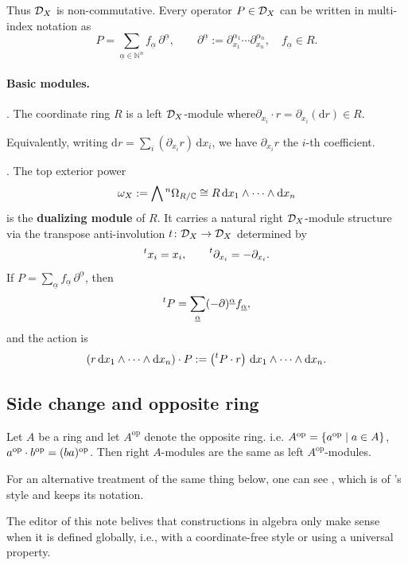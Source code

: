 Thus $\mathcal{D}_X$ is non-commutative. Every operator $P\in\mathcal{D}_X$ can be written in multi-index notation as
\[
    P=\sum_{\underline{\alpha}\in\mathbb N^n} f_{\underline{\alpha}}\,\partial^{\underline{\alpha}},\qquad
    \partial^{\underline{\alpha}}:=\partial_{x_1}^{\alpha_1}\cdots\partial_{x_n}^{\alpha_n},\quad f_{\underline{\alpha}}\in R.
\]

\paragraph{Basic modules.}\mbox{}\par

.  The coordinate ring $R$ is a left $\mathcal{D}_X$-module where$\partial_{x_i}\cdot r = \partial_{x_i}(\mathrm d r)\in R$.

\noindent Equivalently, writing $\mathrm dr=\sum_i (\partial_{x_i}r)\,\mathrm d x_i$, we have $\partial_{x_i}r$ the
$i$-th coefficient.\\

\par{}.  The top exterior power
\[
    \omega_X := \bigwedge{}^{n}\Omega_{R/\mathbb{C}} \cong R\,\mathrm d x_1\wedge\cdots\wedge\mathrm d x_n
\]
is the \textbf{dualizing module} of $R$. It carries a natural right $\mathcal{D}_X$-module structure via the transpose
anti-involution $t\colon \mathcal{D}_X\to\mathcal{D}_X$ determined by
\[
    \prescript{t}{}{x_i}=x_i,\qquad \prescript{t}{}{\partial_{x_i}}=-\partial_{x_i}.
\]
If $P=\sum_{\underline{\alpha}} f_{\underline{\alpha}}\,\partial^{\underline{\alpha}}$, then
\[
    \prescript{t}{}{P}=\sum_{\underline{\alpha}} (-\partial)^{\underline{\alpha}} f_{\underline{\alpha}},
\]
and the action is \cite[Lemma~1.2.6.]{hotta2008d}
\[
    (r\,\mathrm d x_1\wedge\cdots\wedge\mathrm d x_n)\cdot P := \left(\prescript{t}{}{P}\cdot r\right)\,\mathrm d x_1\wedge\cdots\wedge\mathrm d x_n.
\]

\subsection*{Side change and opposite ring}
Let $A$ be a ring and let $A^{\mathrm{op}}$ denote the opposite ring. i.e. $A^{\mathrm{op}} = \{ a^{\mathrm{op}} \mid a \in A \}$, $a^{\mathrm{op}} \cdot b^{\mathrm{op}} = (ba)^{\mathrm{op}}$. Then right $A$-modules are the
same as left $A^{\mathrm{op}}$-modules.

\begin{remark}
    For an alternative treatment of the same thing below, one can see \cite[Section~3.6.]{mustata2023dmodules}, which is of \cite{hotta2008d}'s style and keeps its notation.

    The editor of this note belives that constructions in algebra only make sense when it is defined globally, i.e., with a coordinate-free style or using a universal property.
\end{remark}

